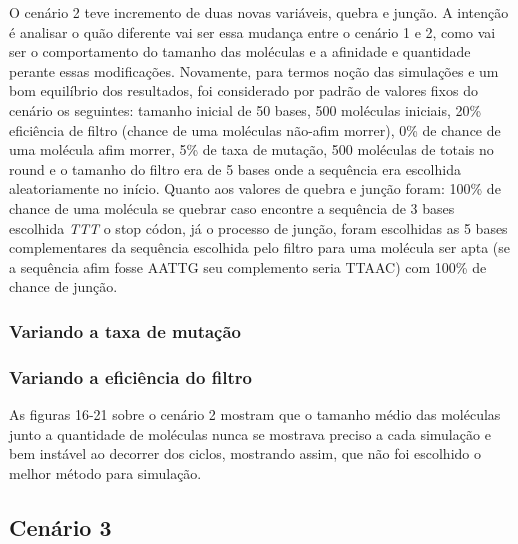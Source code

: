 O cenário 2 teve incremento de duas novas variáveis, quebra e junção. A intenção é
analisar o quão diferente vai ser essa mudança entre o cenário 1 e 2, como vai ser o
comportamento do tamanho das moléculas e a afinidade e quantidade perante essas
modificações. Novamente, para termos noção das simulações e um bom equilíbrio dos
resultados, foi considerado por padrão de valores fixos do cenário os seguintes: tamanho
inicial de 50 bases, 500 moléculas iniciais, 20\% eficiência de filtro (chance de uma
moléculas não-afim morrer), 0\% de chance de uma molécula afim morrer, 5\% de taxa de
mutação, 500 moléculas de totais no round e o tamanho do filtro era de 5 bases onde a
sequência era escolhida aleatoriamente no início. Quanto aos valores de quebra e junção
foram: 100\% de chance de uma molécula se quebrar caso encontre a sequência de 3 bases
escolhida \emph{TTT} o stop códon, já o processo de junção, foram escolhidas as 5 bases
complementares da sequência escolhida pelo filtro para uma molécula ser apta (se a
sequência afim fosse AATTG seu complemento seria TTAAC) com 100\% de chance de junção.

\subsubsection{Variando a taxa de mutação}


\subsubsection{Variando a eficiência do filtro}


As figuras 16-21 sobre o cenário 2 mostram que o tamanho médio das moléculas
junto a quantidade de moléculas nunca se mostrava preciso a cada simulação e bem
instável ao decorrer dos ciclos, mostrando assim, que não foi escolhido o melhor método
para simulação.

\subsection{Cenário 3}

